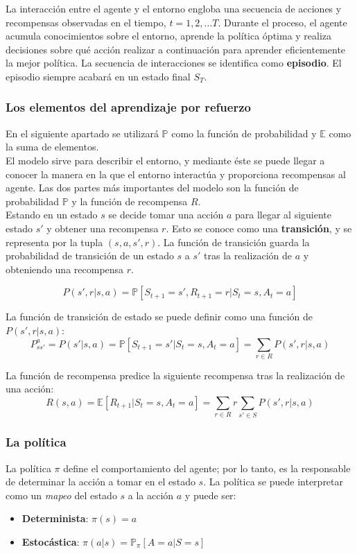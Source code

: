 La interacción entre el agente y el entorno engloba una secuencia de acciones y recompensas observadas en el tiempo, $t = 1, 2,... T$. Durante el proceso, el agente acumula conocimientos sobre el entorno, aprende la política óptima y realiza decisiones sobre qué acción realizar a continuación para aprender eficientemente la mejor política. La secuencia de interacciones se identifica como \textbf{episodio}. El episodio siempre acabará en un estado final $S_T$. 


\subsubsection{Los elementos del aprendizaje por refuerzo}

En el siguiente apartado se utilizará $\mathbb{P}$ como la función de probabilidad y $\mathbb{E}$ como la suma de elementos. \\

 El modelo sirve para describir el entorno, y mediante éste se puede llegar a conocer la manera en la que el entorno interactúa y proporciona recompensas al agente. Las dos partes más importantes del modelo son la función de probabilidad $\mathbb{P}$ y la función de recompensa $R$.\\ 
 
 Estando en un estado $s$ se decide tomar una acción $a$ para llegar al siguiente estado $s'$ y obtener una recompensa $r$. Esto se conoce como una \textbf{transición}, y se representa por la tupla $(s, a, s', r)$. La función de transición guarda la probabilidad de transición de un estado $s$ a $s'$ tras la realización de $a$ y obteniendo una recompensa $r$.

\[ P(s', r|s, a) = \mathbb{P}[S_{t+1} = s', R_{t+1} = r |S_t = s, A_t = a] \]


La función de transición de estado se puede definir como una función de $P(s', r|s, a)$:
\[ P^a_{ss'} = P(s'|s, a) =\mathbb{P}[S_{t+1} = s'|S_t = s, A_t = a] = \sum_{r \in R} P(s', r|s, a) \]

La función de recompensa predice la siguiente recompensa tras la realización de una acción: 
\[ R(s,a) = \mathbb{E}[R_{t+1}|S_t = s, A_t=a]=\sum_{r \in R} r \sum_{s' \in S}P(s', r|s, a) \]

\subsubsection{La política}

La política $\pi$ define el comportamiento del agente; por lo tanto, es la responsable de determinar la acción a tomar en el estado $s$. La política se puede interpretar como un \textit{mapeo} del estado $s$ a la acción $a$ y puede ser:
\begin{itemize}
    \item \textbf{Determinista}: $\pi(s)=a$
    \item \textbf{Estocástica}: $\pi(a|s)=\mathbb{P}_\pi[A=a|S=s]$
\end{itemize}

